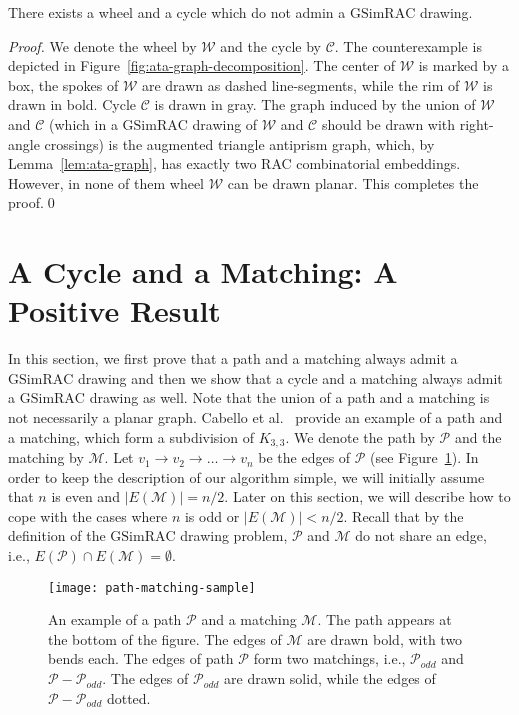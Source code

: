 \documentclass{llncs}
\newcommand{\GSimRAC}{\mathrm{GSimRAC}}
\begin{document}
\begin{theorem}
\label{thm:wheel-cycle} There exists a wheel and a cycle which do
not admin a $\GSimRAC$ drawing.
\end{theorem}
\begin{proof}
We denote the wheel by $\mathcal{W}$ and the cycle by $\mathcal{C}$.
The counterexample is depicted in
Figure~\ref{fig:ata-graph-decomposition}. The center of
$\mathcal{W}$ is marked by a box, the spokes of $\mathcal{W}$ are
drawn as dashed line-segments, while the rim of $\mathcal{W}$ is
drawn in bold. Cycle $\mathcal{C}$ is drawn in gray. The graph
induced by the union of $\mathcal{W}$ and $\mathcal{C}$ (which in a
$\GSimRAC$ drawing of $\mathcal{W}$ and $\mathcal{C}$ should be
drawn with right-angle crossings) is the augmented triangle
antiprism graph, which, by Lemma~\ref{lem:ata-graph}, has exactly
two RAC combinatorial embeddings. However, in none of them wheel
$\mathcal{W}$ can be drawn planar. This completes the proof.\qed
\end{proof}

\section{A Cycle and a Matching: A Positive Result}
\label{sec:cycle-matching}


In this section, we first prove that a path and a matching always
admit a $\GSimRAC$ drawing and then we show that a cycle and a
matching always admit a $\GSimRAC$ drawing as well. Note that the
union of a path and a matching is not necessarily a planar graph.
Cabello et al.\ \cite{CvKLMSV11} provide an example of a path and a
matching, which form a subdivision of $K_{3,3}$. We denote the path
by $\mathcal{P}$ and the matching by $\mathcal{M}$. Let $v_1
\rightarrow v_2 \rightarrow \ldots \rightarrow v_n$ be the edges of
$\mathcal{P}$ (see Figure~\ref{fig:path-matching-sample}). In order
to keep the description of our algorithm simple, we will initially
assume that $n$ is even and $|E(\mathcal{M})|=n/2$. Later on this
section, we will describe how to cope with the cases where $n$ is
odd or $|E(\mathcal{M})|<n/2$. Recall that by the definition of the
$\GSimRAC$ drawing problem, $\mathcal{P}$ and $\mathcal{M}$ do not
share an edge, i.e., $E(\mathcal{P}) \cap E(\mathcal{M}) =
\emptyset$.





\begin{figure}[h!tb]
  \centering
  \texttt{[image: path-matching-sample]}
  \caption{An example of a path $\mathcal{P}$ and a matching $\mathcal{M}$.
  The path appears at the bottom of the figure. The edges of $\mathcal{M}$ are drawn bold, with two bends each.
  The edges of path $\mathcal{P}$ form two matchings, i.e., $\mathcal{P}_{odd}$
  and $\mathcal{P}-\mathcal{P}_{odd}$. The edges of $\mathcal{P}_{odd}$ are drawn solid, while the edges of $\mathcal{P}-\mathcal{P}_{odd}$ dotted. }
  \label{fig:path-matching-sample}
\end{figure}
\end{document}
